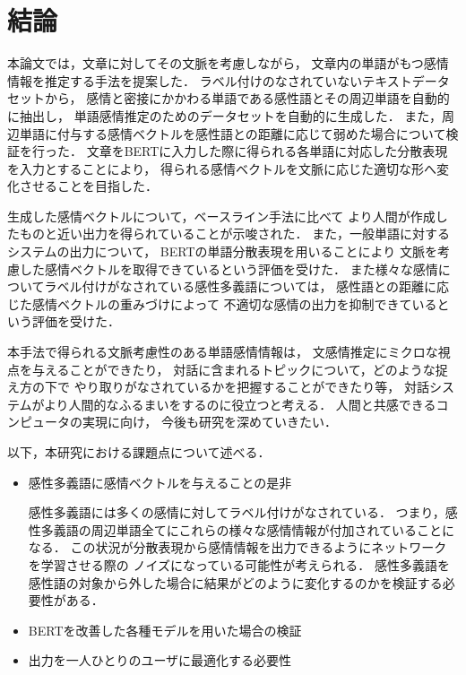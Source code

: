 \chapter{結論}
本論文では，文章に対してその文脈を考慮しながら，
文章内の単語がもつ感情情報を推定する手法を提案した．
ラベル付けのなされていないテキストデータセットから，
感情と密接にかかわる単語である感性語とその周辺単語を自動的に抽出し，
単語感情推定のためのデータセットを自動的に生成した．
また，周辺単語に付与する感情ベクトルを感性語との距離に応じて弱めた場合について検証を行った．
文章をBERTに入力した際に得られる各単語に対応した分散表現を入力とすることにより，
得られる感情ベクトルを文脈に応じた適切な形へ変化させることを目指した．

生成した感情ベクトルについて，ベースライン手法に比べて
より人間が作成したものと近い出力を得られていることが示唆された．
また，一般単語に対するシステムの出力について，
BERTの単語分散表現を用いることにより
文脈を考慮した感情ベクトルを取得できているという評価を受けた．
また様々な感情についてラベル付けがなされている感性多義語については，
感性語との距離に応じた感情ベクトルの重みづけによって
不適切な感情の出力を抑制できているという評価を受けた．

本手法で得られる文脈考慮性のある単語感情情報は，
文感情推定にミクロな視点を与えることができたり，
対話に含まれるトピックについて，どのような捉え方の下で
やり取りがなされているかを把握することができたり等，
対話システムがより人間的なふるまいをするのに役立つと考える．
人間と共感できるコンピュータの実現に向け，
今後も研究を深めていきたい．

以下，本研究における課題点について述べる．
\begin{itemize}
	\item 感性多義語に感情ベクトルを与えることの是非
	\par 感性多義語には多くの感情に対してラベル付けがなされている．
	つまり，感性多義語の周辺単語全てにこれらの様々な感情情報が付加されていることになる．
	この状況が分散表現から感情情報を出力できるようにネットワークを学習させる際の
	ノイズになっている可能性が考えられる．
	感性多義語を感性語の対象から外した場合に結果がどのように変化するのかを検証する必要性がある．
	\item BERTを改善した各種モデルを用いた場合の検証
	\item 出力を一人ひとりのユーザに最適化する必要性
\end{itemize}